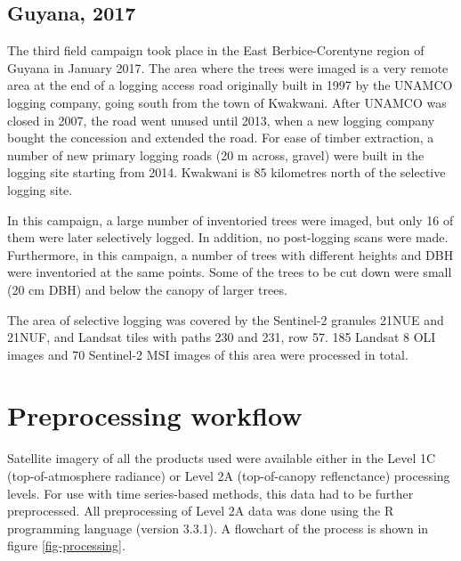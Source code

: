 \documentclass[a4paper,12pt]{scrbook}
\begin{document}

\subsection{Guyana, 2017}

The third field campaign took place in the East Berbice-Corentyne region of Guyana in January 2017. The area where the trees were imaged is a very remote area at the end of a logging access road originally built in 1997 by the UNAMCO logging company, going south from the town of Kwakwani. After UNAMCO was closed in 2007, the road went unused until 2013, when a new logging company bought the concession and extended the road. For ease of timber extraction, a number of new primary logging roads (20 m across, gravel) were built in the logging site starting from 2014. Kwakwani is 85 kilometres north of the selective logging site.

In this campaign, a large number of inventoried trees were imaged, but only 16 of them were later selectively logged. In addition, no post-logging scans were made. Furthermore, in this campaign, a number of trees with different heights and \ac{DBH} were inventoried at the same points. Some of the trees to be cut down were small (20 cm \ac{DBH}) and below the canopy of larger trees.

The area of selective logging was covered by the Sentinel-2 granules 21NUE and 21NUF, and Landsat tiles with paths 230 and 231, row 57. 185 Landsat 8 \ac{OLI} images and 70 Sentinel-2 \ac{MSI} images of this area were processed in total.


\section{Preprocessing workflow}

Satellite imagery of all the products used were available either in the Level 1C (top-of-atmosphere radiance) or Level 2A (top-of-canopy reflenctance) processing levels. For use with time series-based methods, this data had to be further preprocessed. All preprocessing of Level 2A data was done using the R programming language (version 3.3.1). A flowchart of the process is shown in figure \ref{fig-processing}.
\end{document}

